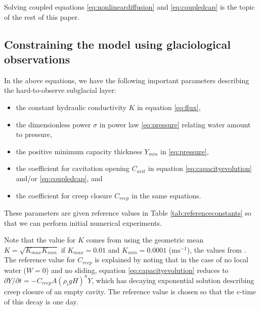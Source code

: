 \documentclass[11pt]{amsart}
\newcommand{\Cavit}{C_{avit}}
\newcommand{\Creep}{C_{reep}}
\begin{document}
Solving coupled equations \eqref{eq:nonlineardiffusion} and \eqref{eq:coupledcap} is the topic of the rest of this paper.


\subsection*{Constraining the model using glaciological observations}  In the above equations, we have the following important parameters describing the hard-to-observe subglacial layer: 
\begin{itemize}
\item the constant hydraulic conductivity $K$ in equation \eqref{eq:flux},
\item the dimensionless power $\sigma$ in power law \eqref{eq:pressure} relating water amount to pressure,
\item the positive minimum capacity thickness $Y_{min}$ in \eqref{eq:pressure},
\item the coefficient for cavitation opening $\Cavit$ in equation \eqref{eq:capacityevolution} and/or \eqref{eq:coupledcap}, and
\item the coefficient for creep closure $\Creep$ in the same equations.
\end{itemize} 
These parameters are given reference values in Table \ref{tab:referenceconstants} so that we can perform initial numerical experiments.

Note that the value for $K$ comes from using the geometric mean $K=\sqrt{K_{max} K_{min}}$ if $K_{max}=0.01$ and $K_{min}=0.0001$ (m$\text{s}^{-1}$), the values from \citep{FlowersClarke2002_theory}.  The reference value for $C_{reep}$ is explained by noting that in the case of no local water ($W=0$) and no sliding, equation \eqref{eq:capacityevolution} reduces to $\partial Y/\partial t = - C_{reep} A (\rho_i g H)^n Y$, which has decaying exponential solution describing creep closure of an empty cavity.  The reference value is chosen so that the $e$-time of this decay is one day.
\end{document}
